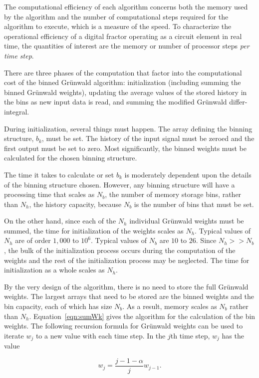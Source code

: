 The computational efficiency of each algorithm concerns both the
memory used by the algorithm and the number of computational steps
required for the algorithm to execute, which is a measure of the
speed. To characterize the operational efficiency of a digital fractor
operating as a circuit element in real time, the quantities of
interest are the memory or number of processor steps {\em per time
  step}.

There are three phases of the computation that factor into the
computational cost of the binned Gr{\"u}nwald algorithm: initialization
(including summing the binned Gr{\"u}nwald weights), updating the average
values of the stored history in the bins as new input data is read,
and summing the modified Gr{\"u}nwald differ-integral.

During initialization, several things must happen. The array defining
the binning structure, $b_k$, must be set. The history of the input
signal must be zeroed and the first output must be set to zero. Most significantly, the binned weights must be calculated for
the chosen binning structure.

The time it takes to calculate or set $b_k$ is moderately dependent
upon the details of the binning structure chosen. However, any binning
structure will have a processing time that scales as $N_b$, the number of memory storage bins, rather than
$N_h$, the history capacity, because $N_b$ is the number of bins that must be set.

On the other hand, since each of the $N_h$ individual Gr{\"u}nwald weights
must be summed, the time for initialization of the weights scales as
$N_h$. Typical values of $N_h$ are of order $1,000$ to $10^6$. Typical
values of $N_b$ are $10$ to $26$. Since $N_h>>N_b$, the bulk of the
initialization process occurs during the computation of the weights
and the rest of the initialization process may be neglected. The time
for initialization as a whole scales as $N_h$.

By the very design of the algorithm, there is no need to store the
full Gr{\"u}nwald weights. The largest arrays that need to be stored are
the binned weights and the bin capacity, each of which has size
$N_b$. As a result, memory scales as $N_b$ rather than
$N_h$. Equation~\ref{eqn:sumWk} gives the algorithm for the calculation
of the bin weights. The following recursion formula for Gr{\"u}nwald
weights can be used to iterate $w_j$ to a new value with each time
step. In the $j$th time step, $w_j$ has the value

\begin{equation}
w_j = \frac{j-1-\alpha}{j}w_{j-1}.
\label{eqn:GrunwaldRecursion}
\end{equation}

